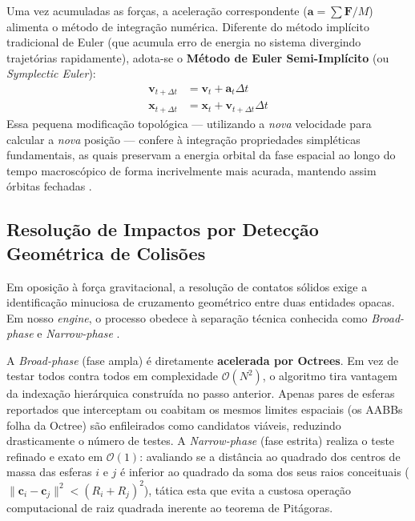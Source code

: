 \documentclass[11pt,a4paper]{article}
\begin{document}
Uma vez acumuladas as forças, a aceleração correspondente ($\mathbf{a} = \sum \mathbf{F} / M$) alimenta o método de integração numérica. Diferente do método implícito tradicional de Euler (que acumula erro de energia no sistema divergindo trajetórias rapidamente), adota-se o \textbf{Método de Euler Semi-Implícito} (ou \textit{Symplectic Euler}):
\begin{align}
    \mathbf{v}_{t+\Delta t} &= \mathbf{v}_t + \mathbf{a}_t \Delta t \\
    \mathbf{x}_{t+\Delta t} &= \mathbf{x}_t + \mathbf{v}_{t+\Delta t} \Delta t
\end{align}
Essa pequena modificação topológica — utilizando a \textit{nova} velocidade para calcular a \textit{nova} posição — confere à integração propriedades simpléticas fundamentais, as quais preservam a energia orbital da fase espacial ao longo do tempo macroscópico de forma incrivelmente mais acurada, mantendo assim órbitas fechadas \cite{hockney}.

\subsection{Resolução de Impactos por Detecção Geométrica de Colisões}

Em oposição à força gravitacional, a resolução de contatos sólidos exige a identificação minuciosa de cruzamento geométrico entre duas entidades opacas. Em nosso \textit{engine}, o processo obedece à separação técnica conhecida como \textit{Broad-phase} e \textit{Narrow-phase} \cite{ericson}. 

A \textit{Broad-phase} (fase ampla) é diretamente \textbf{acelerada por Octrees}. Em vez de testar todos contra todos em complexidade $\mathcal{O}(N^2)$, o algoritmo tira vantagem da indexação hierárquica construída no passo anterior. Apenas pares de esferas reportados que interceptam ou coabitam os mesmos limites espaciais (os AABBs folha da Octree) são enfileirados como candidatos viáveis, reduzindo drasticamente o número de testes. A \textit{Narrow-phase} (fase estrita) realiza o teste refinado e exato em $\mathcal{O}(1)$: avaliando se a distância ao quadrado dos centros de massa das esferas $i$ e $j$ é inferior ao quadrado da soma dos seus raios conceituais ($\|\mathbf{c}_i - \mathbf{c}_j\|^2 < (R_i + R_j)^2$), tática esta que evita a custosa operação computacional de raiz quadrada inerente ao teorema de Pitágoras.
\end{document}
